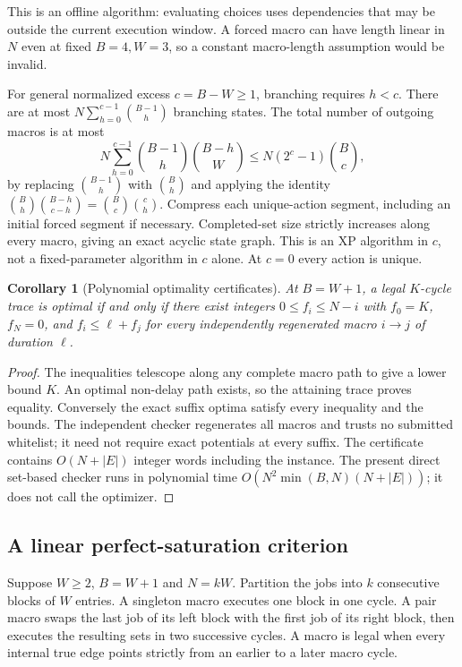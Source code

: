 \documentclass[11pt]{article}
\newtheorem{corollary}[theorem]{Corollary}
\begin{document}
This is an offline algorithm: evaluating choices uses dependencies that may
be outside the current execution window. A forced macro can have length
linear in $N$ even at fixed $B=4,W=3$, so a constant macro-length assumption
would be invalid.

For general normalized excess $c=B-W\ge1$, branching requires $h<c$.
There are at most $N\sum_{h=0}^{c-1}\binom{B-1}{h}$ branching states.
The total number of outgoing macros is at most
\[
 N\sum_{h=0}^{c-1}\binom{B-1}{h}\binom{B-h}{W}
 \le N(2^c-1)\binom{B}{c},
\]
by replacing $\binom{B-1}{h}$ with $\binom{B}{h}$ and applying the identity
$\binom{B}{h}\binom{B-h}{c-h}=\binom{B}{c}\binom{c}{h}$.
Compress each unique-action segment, including an initial forced segment
if necessary. Completed-set size strictly increases along every macro,
giving an exact acyclic state graph. This is an XP algorithm in $c$,
not a fixed-parameter algorithm in $c$ alone. At $c=0$ every action is unique.

\begin{corollary}[Polynomial optimality certificates]
At $B=W+1$, a legal $K$-cycle trace is optimal if and only if there exist
integers $0\le f_i\le N-i$ with $f_0=K$, $f_N=0$, and
$f_i\le\ell+f_j$ for every independently regenerated macro $i\to j$ of
duration $\ell$.
\end{corollary}
\begin{proof}
The inequalities telescope along any complete macro path to give a lower
bound $K$. An optimal non-delay path exists, so the attaining trace proves
equality. Conversely the exact suffix optima satisfy every inequality and
the bounds. The independent checker regenerates all macros and trusts no
submitted whitelist; it need not require exact potentials at every suffix.
The certificate contains $O(N+|E|)$ integer words including the instance.
The present direct set-based checker runs in polynomial time
$O(N^2\min(B,N)(N+|E|))$; it does not call the optimizer.
\end{proof}

\subsection{A linear perfect-saturation criterion}
Suppose $W\ge2$, $B=W+1$ and $N=kW$. Partition the jobs into $k$
consecutive blocks of $W$ entries. A singleton macro executes one block
in one cycle. A pair macro swaps the last job of its left block with the
first job of its right block, then executes the resulting sets in two
successive cycles. A macro is legal when every internal true edge points
strictly from an earlier to a later macro cycle.
\end{document}
